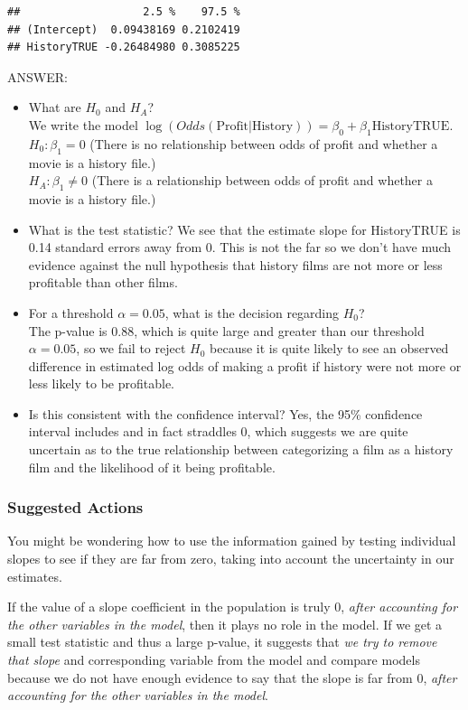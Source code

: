\documentclass[
]{book}
\begin{document}
\begin{verbatim}
##                   2.5 %    97.5 %
## (Intercept)  0.09438169 0.2102419
## HistoryTRUE -0.26484980 0.3085225
\end{verbatim}

ANSWER:

\begin{itemize}
\item
  What are \(H_0\) and \(H_A\)?\\
  We write the model \(\log(Odds(\text{Profit}|\text{History})) = \beta_0 + \beta_1\text{HistoryTRUE}\).\\
  \(H_0: \beta_1 = 0\) (There is no relationship between odds of profit and whether a movie is a history file.)\\
  \(H_A: \beta_1 \neq 0\) (There is a relationship between odds of profit and whether a movie is a history file.)
\item
  What is the test statistic?
  We see that the estimate slope for HistoryTRUE is 0.14 standard errors away from 0. This is not the far so we don't have much evidence against the null hypothesis that history films are not more or less profitable than other films.
\item
  For a threshold \(\alpha = 0.05\), what is the decision regarding \(H_0\)?\\
  The p-value is 0.88, which is quite large and greater than our threshold \(\alpha = 0.05\), so we fail to reject \(H_0\) because it is quite likely to see an observed difference in estimated log odds of making a profit if history were not more or less likely to be profitable.
\item
  Is this consistent with the confidence interval?
  Yes, the 95\% confidence interval includes and in fact straddles 0, which suggests we are quite uncertain as to the true relationship between categorizing a film as a history film and the likelihood of it being profitable.
\end{itemize}

\hypertarget{suggested-actions}{%
\subsubsection{Suggested Actions}\label{suggested-actions}}

You might be wondering how to use the information gained by testing individual slopes to see if they are far from zero, taking into account the uncertainty in our estimates.

If the value of a slope coefficient in the population is truly 0, \emph{after accounting for the other variables in the model}, then it plays no role in the model. If we get a small test statistic and thus a large p-value, it suggests that \emph{we try to remove that slope} and corresponding variable from the model and compare models because we do not have enough evidence to say that the slope is far from 0, \emph{after accounting for the other variables in the model}.
\end{document}
